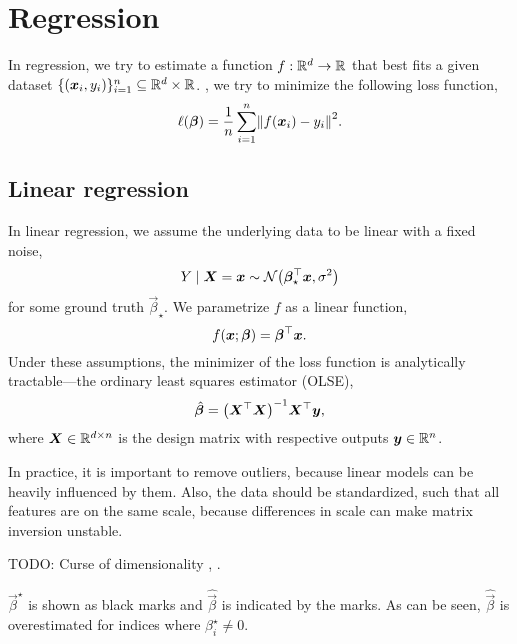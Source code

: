 \section{Regression}

In regression, we try to estimate a function $f: \mathbb{R}^d \to \mathbb{R}$ that best fits a given dataset $\{
    (\bm{x}_i, y_i) \}_{i=1}^n \subseteq \mathbb{R}^d \times \mathbb{R}$. \Ie, we try to minimize the following loss
function, \[
    \ell(\vec{\beta}) = \frac{1}{n} \sum_{i=1}^{n} \lft\| f(\vec{x}_i) - y_i \rgt\|^2.
\]

\subsection{Linear regression}

In linear regression, we assume the underlying data to be linear with a fixed noise, \[
    Y \mid \vec{X} = \vec{x} \sim \mathcal{N} \lft( \transpose{\vec{\beta}_\star} \vec{x}, \sigma^2 \rgt)
\]
for some ground truth $\vec{\beta}_\star$. We parametrize $f$ as a linear function, \[
    f(\bm{x}; \bm{\beta}) = \bm{\beta}^\top \bm{x}.
\]
Under these assumptions, the minimizer of the loss function is analytically tractable---the
ordinary least squares estimator (OLSE), \[
    \hat{\vec{\beta}} = \inv{\lft( \transpose{\mat{X}} \mat{X} \rgt)} \transpose{\mat{X}} \vec{y},
\]
where $\bm{X} \in \mathbb{R}^{d \times n}$ is the design matrix with respective outputs $\bm{y} \in
    \mathbb{R}^n$.

In practice, it is important to remove outliers, because linear models can be heavily influenced by
them. Also, the data should be standardized, such that all features are on the same scale, because
differences in scale can make matrix inversion unstable.

TODO: Curse of dimensionality \citep{sur2019modern}, .

\begin{marginfigure}
    \caption{$\vec{\beta}^\star$ is shown as black marks and $\hat{\vec{\beta}}$ is indicated by the marks. As can be seen, $\hat{\vec{\beta}}$ is overestimated for indices where $\beta^\star_i \neq 0$.}
    \label{fig:overestimation}
\end{marginfigure}

